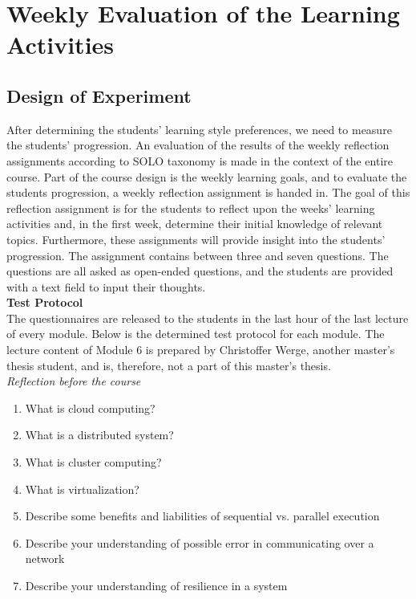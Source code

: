 \section{Weekly Evaluation of the Learning Activities}
\subsection*{Design of Experiment}

After determining the students' learning style preferences, we need to measure the students' progression. An evaluation of the results of the weekly reflection assignments according to SOLO taxonomy is made in the context of the entire course. Part of the course design is the weekly learning goals, and to evaluate the students progression, a weekly reflection assignment is handed in. The goal of this reflection assignment is for the students to reflect upon the weeks' learning activities and, in the first week, determine their initial knowledge of relevant topics. Furthermore, these assignments will provide insight into the students' progression. The assignment contains between three and seven questions. The questions are all asked as open-ended questions, and the students are provided with a text field to input their thoughts. \\

\noindent\textbf{Test Protocol}\\
The questionnaires are released to the students in the last hour of the last lecture of every module. Below is the determined test protocol for each module. The lecture content of Module 6 is prepared by Christoffer Werge, another master's thesis student, and is, therefore, not a part of this master's thesis. \\

\noindent\textit{Reflection before the course}\\
\vspace{-5mm}
\begin{enumerate}
    \setlength\itemsep{0.05em}
  \item What is cloud computing?
  \item What is a distributed system?
  \item What is cluster computing?
  \item What is virtualization?
  \item Describe some benefits and liabilities of sequential vs. parallel execution
  \item Describe your understanding of possible error in communicating over a network
  \item Describe your understanding of resilience in a system
\end{enumerate}

